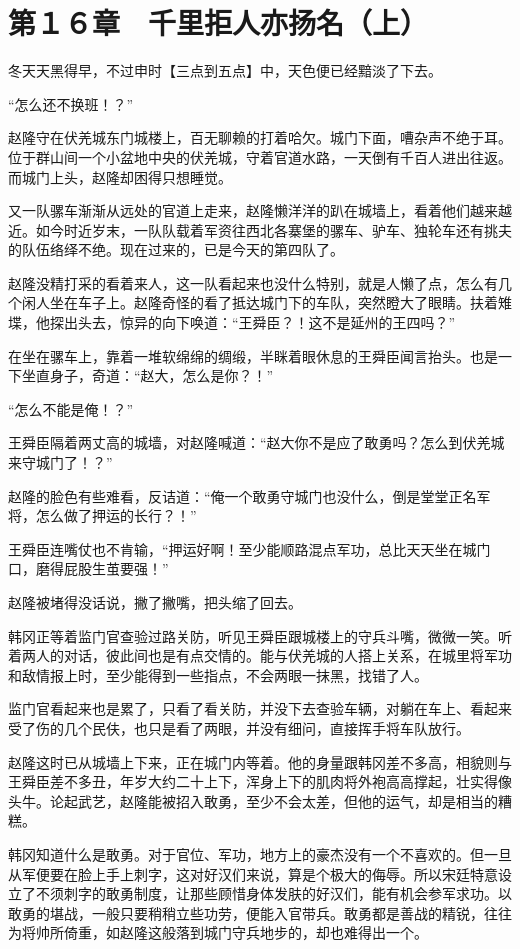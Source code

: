 \section{第１６章　千里拒人亦扬名（上）}

冬天天黑得早，不过申时【三点到五点】中，天色便已经黯淡了下去。

“怎么还不换班！？”

赵隆守在伏羌城东门城楼上，百无聊赖的打着哈欠。城门下面，嘈杂声不绝于耳。位于群山间一个小盆地中央的伏羌城，守着官道水路，一天倒有千百人进出往返。而城门上头，赵隆却困得只想睡觉。

又一队骡车渐渐从远处的官道上走来，赵隆懒洋洋的趴在城墙上，看着他们越来越近。如今时近岁末，一队队载着军资往西北各寨堡的骡车、驴车、独轮车还有挑夫的队伍络绎不绝。现在过来的，已是今天的第四队了。

赵隆没精打采的看着来人，这一队看起来也没什么特别，就是人懒了点，怎么有几个闲人坐在车子上。赵隆奇怪的看了抵达城门下的车队，突然瞪大了眼睛。扶着雉堞，他探出头去，惊异的向下唤道：“王舜臣？！这不是延州的王四吗？”

在坐在骡车上，靠着一堆软绵绵的绸缎，半眯着眼休息的王舜臣闻言抬头。也是一下坐直身子，奇道：“赵大，怎么是你？！”

“怎么不能是俺！？”

王舜臣隔着两丈高的城墙，对赵隆喊道：“赵大你不是应了敢勇吗？怎么到伏羌城来守城门了！？”

赵隆的脸色有些难看，反诘道：“俺一个敢勇守城门也没什么，倒是堂堂正名军将，怎么做了押运的长行？！”

王舜臣连嘴仗也不肯输，“押运好啊！至少能顺路混点军功，总比天天坐在城门口，磨得屁股生茧要强！”

赵隆被堵得没话说，撇了撇嘴，把头缩了回去。

韩冈正等着监门官查验过路关防，听见王舜臣跟城楼上的守兵斗嘴，微微一笑。听着两人的对话，彼此间也是有点交情的。能与伏羌城的人搭上关系，在城里将军功和敌情报上时，至少能得到一些指点，不会两眼一抹黑，找错了人。

监门官看起来也是累了，只看了看关防，并没下去查验车辆，对躺在车上、看起来受了伤的几个民伕，也只是看了两眼，并没有细问，直接挥手将车队放行。

赵隆这时已从城墙上下来，正在城门内等着。他的身量跟韩冈差不多高，相貌则与王舜臣差不多丑，年岁大约二十上下，浑身上下的肌肉将外袍高高撑起，壮实得像头牛。论起武艺，赵隆能被招入敢勇，至少不会太差，但他的运气，却是相当的糟糕。

韩冈知道什么是敢勇。对于官位、军功，地方上的豪杰没有一个不喜欢的。但一旦从军便要在脸上手上刺字，这对好汉们来说，算是个极大的侮辱。所以宋廷特意设立了不须刺字的敢勇制度，让那些顾惜身体发肤的好汉们，能有机会参军求功。以敢勇的堪战，一般只要稍稍立些功劳，便能入官带兵。敢勇都是善战的精锐，往往为将帅所倚重，如赵隆这般落到城门守兵地步的，却也难得出一个。


